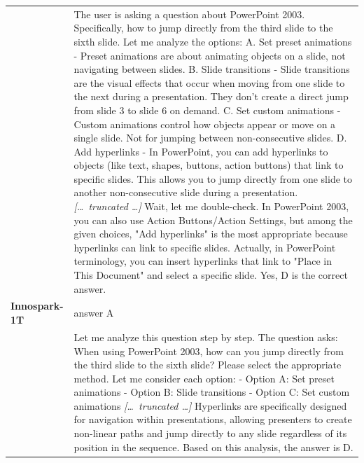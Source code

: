 \begin{longtable}{@{}l p{12.5cm}@{}}
  & The user is asking a question about PowerPoint 2003. Specifically, how to jump directly from the third slide to the sixth slide. \newline Let me analyze the options: \newline A. Set preset animations - Preset animations are about animating objects on a slide, not navigating between slides. \newline B. Slide transitions - Slide transitions are the visual effects that occur when moving from one slide to the next during a presentation. They don't create a direct jump from slide 3 to slide 6 on demand. \newline C. Set custom animations - Custom animations control how objects appear or move on a single slide. Not for jumping between non-consecutive slides. \newline D. Add hyperlinks - In PowerPoint, you can add hyperlinks to objects (like text, shapes, buttons, action buttons) that link to specific slides. This allows you to jump directly from one slide to another non-consecutive slide during a presentation. \newline \textit{[\ldots\ truncated \ldots]} \newline Wait, let me double-check. In PowerPoint 2003, you can also use Action Buttons/Action Settings, but among the given choices, "Add hyperlinks" is the most appropriate because hyperlinks can link to specific slides. Actually, in PowerPoint terminology, you can insert hyperlinks that link to "Place in This Document" and select a specific slide. \newline Yes, D is the correct answer. \\
  \textbf{Innospark-1T} & answer A \\
  & Let me analyze this question step by step. \newline The question asks: When using PowerPoint 2003, how can you jump directly from the third slide to the sixth slide? Please select the appropriate method. \newline Let me consider each option: \newline - Option A: Set preset animations \newline - Option B: Slide transitions \newline - Option C: Set custom animations \newline \textit{[\ldots\ truncated \ldots]} \newline Hyperlinks are specifically designed for navigation within presentations, allowing presenters to create non-linear paths and jump directly to any slide regardless of its position in the sequence. \newline Based on this analysis, the answer is D. \\

\end{longtable}
